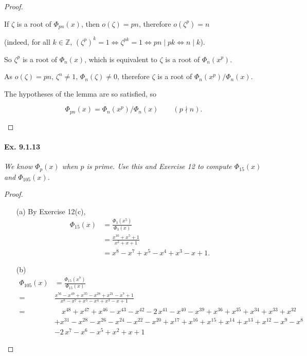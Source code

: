 \documentclass[11pt,a4paper]{article}
\newcommand{\Z}{\mathbb{Z}}
\begin{document}
\begin{proof}
\begin{enumerate}
If $\zeta$ is a root of $\Phi_{pn}(x)$, then $o(\zeta) = pn$, therefore $o(\zeta^p) = n$ 

(indeed, for all $k\in \Z$, $ (\zeta^p)^k = 1 \iff \zeta^{pk}=1 \iff pn \mid pk \iff n \mid k$).

So $\zeta^p$ is a root of $\Phi_n(x)$, which is equivalent to $\zeta$ is a root of $\Phi_{n}(x^p)$.

As $o(\zeta) = pn$, $\zeta^n \neq 1$, $\Phi_n(\zeta)\neq 0$, therefore $\zeta$ is a root of $\Phi_{n}(x^p)/\Phi_n(x)$.

The hypotheses of the lemma are so satisfied, so 

$$\Phi_{pn}(x) = \Phi_n(x^p)/\Phi_n(x) \qquad (p\nmid n).$$

\end{enumerate}
\end{proof}

\paragraph{Ex. 9.1.13}

{\it We know $\Phi_p(x)$ when $p$ is prime. Use this and Exercise 12 to compute $\Phi_{15}(x)$ and $\Phi_{105}(x)$.
}

\begin{proof}
\begin{enumerate}
\item[(a)]
By Exercise 12(c), 
\begin{align*}
\Phi_{15}(x) &= \frac{\Phi_3(x^5)}{\Phi_3(x)}\\
&=\frac{x^{10} +x^5+1}{x^2+x+1}\\
&=x^8 -x^7+x^5 -x^4+x^3 -x+1.
\end{align*}

\item[(b)]
\begin{align*}
\Phi_{105}(x) &= \frac{\Phi_{15}(x^7)}{\Phi_{15}(x)}\\
=& \frac{x^{56} -x^{49}+x^{35} -x^{28}+x^{21} -x^7+1}{x^8 -x^7+x^5 -x^4+x^3 -x+1}\\
=&\quad x^{48} + x^{47} + x^{46} - x^{43} - x^{42} - 2 \, x^{41} - x^{40} - x^{39} + x^{36} + x^{35} + x^{34} + x^{33} + x^{32}\\
 &+ x^{31} - x^{28} - x^{26} - x^{24} - x^{22} - x^{20} + x^{17} + x^{16} + x^{15} + x^{14} + x^{13} + x^{12} - x^{9} - x^{8}\\
  &- 2 \, x^{7} - x^{6} - x^{5} + x^{2} + x + 1
\end{align*}

\end{enumerate}
\end{proof}
\end{document}

